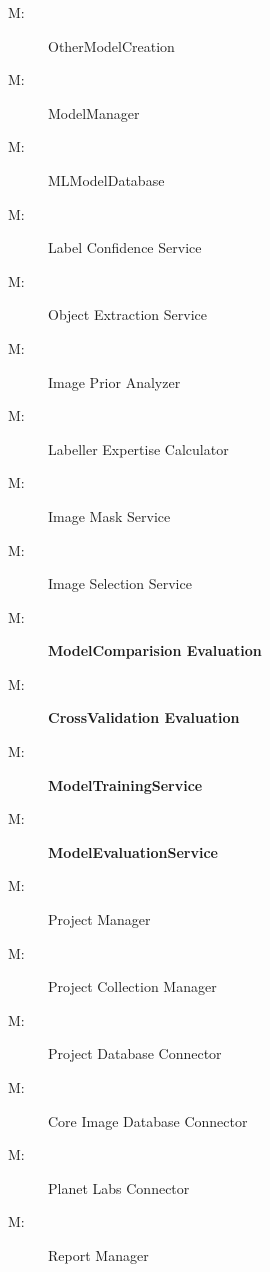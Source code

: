 \documentclass[12pt, titlepage]{article}
\newcounter{mnum}
\newcommand{\mthemnum}{M\themnum}
\begin{document}
\begin{description}
  \item [ \mthemnum \label{othermodelcreation}:]
    OtherModelCreation

  \item [ \mthemnum \label{modelmanager}:]
    ModelManager

  \item [ \mthemnum \label{mlmodeldatabase}:]
    MLModelDatabase
\item [ \mthemnum \label{Label Confidence Service}:]Label Confidence Service
\item [ \mthemnum \label{Object Extraction Service}:]Object Extraction Service
\item [ \mthemnum \label{Image Prior Analyzer}:]Image Prior Analyzer
\item [ \mthemnum \label{Labeller Expertise Calculator}:]Labeller Expertise Calculator
\item [ \mthemnum \label{Image Mask Service}:]Image Mask Service
\item [ \mthemnum \label{Image Selection Service}:]Image Selection Service
  \item [ \mthemnum \label{modelcomparison}:]
    \textbf{ModelComparision Evaluation}

  \item [ \mthemnum \label{crossvalidation}:]
    \textbf{CrossValidation Evaluation}

  \item [ \mthemnum \label{modeltrainingservice}:]
    \textbf{ModelTrainingService}

  \item [ \mthemnum \label{modelevaluationservice}:]
    \textbf{ModelEvaluationService}

\item [ \mthemnum \label{pm}:]
Project Manager
\item [ \mthemnum \label{pcm}:]
Project Collection Manager
\item [ \mthemnum \label{pdbc}:]
Project Database Connector
\item [ \mthemnum \label{cidbc}:]
Core Image Database Connector
\item [ \mthemnum \label{plbsc}:]
Planet Labs Connector
\item [ \mthemnum \label{rm}:]
Report Manager

\end{description}
\end{document}
